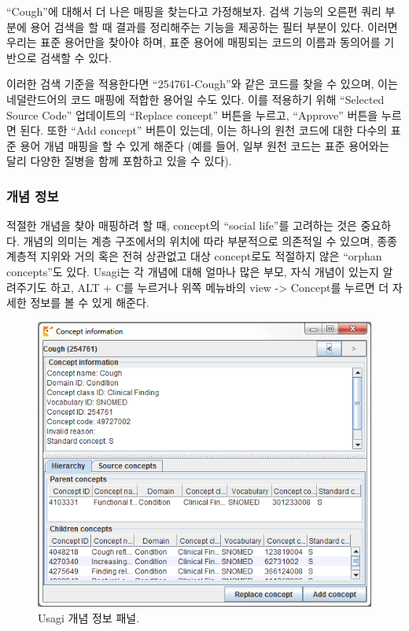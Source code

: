 \documentclass[10.5pt]{book}
\theoremstyle{definition}
\theoremstyle{definition}
\theoremstyle{definition}
\theoremstyle{remark}
\begin{document}
``Cough''에 대해서 더 나은 매핑을 찾는다고 가정해보자. 검색 기능의
오른편 쿼리 부분에 용어 검색을 할 때 결과를 정리해주는 기능을 제공하는
필터 부분이 있다. 이러면 우리는 표준 용어만을 찾아야 하며, 표준 용어에
매핑되는 코드의 이름과 동의어를 기반으로 검색할 수 있다.

이러한 검색 기준을 적용한다면 ``254761-Cough''와 같은 코드를 찾을 수
있으며, 이는 네덜란드어의 코드 매핑에 적합한 용어일 수도 있다. 이를
적용하기 위해 ``Selected Source Code'' 업데이트의 ``Replace concept''
버튼을 누르고, ``Approve'' 버튼을 누르면 된다. 또한 ``Add concept''
버튼이 있는데, 이는 하나의 원천 코드에 대한 다수의 표준 용어 개념 매핑을
할 수 있게 해준다 (예를 들어, 일부 원천 코드는 표준 용어와는 달리 다양한
질병을 함께 포함하고 있을 수 있다).

\subsubsection*{개념 정보}\label{-}

적절한 개념을 찾아 매핑하려 할 때, concept의 ``social life''를 고려하는
것은 중요하다. 개념의 의미는 계층 구조에서의 위치에 따라 부분적으로
의존적일 수 있으며, 종종 계층적 지위와 거의 혹은 전혀 상관없고 대상
concept로도 적절하지 않은 ``orphan concepts''도 있다. Usagi는 각 개념에
대해 얼마나 많은 부모, 자식 개념이 있는지 알려주기도 하고, ALT + C를
누르거나 위쪽 메뉴바의 view -\textgreater{} Concept를 누르면 더 자세한
정보를 볼 수 있게 해준다.

\begin{figure}

{\centering \includegraphics[width=1\linewidth]{images/ExtractTransformLoad/usagiConceptInfo} 

}

\caption{Usagi 개념 정보 패널.}\label{fig:usagiConceptInfo}
\end{figure}
\end{document}
